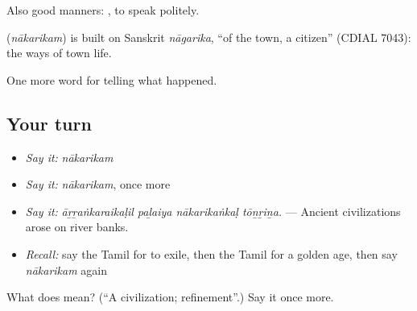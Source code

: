 Also good manners:  , to speak politely.

\begin{cousinweb}
\textbf{} (\emph{nākarikam}) is built on Sanskrit \emph{nāgarika}, \textquotedblleft{}of the town, a citizen\textquotedblright{} (CDIAL 7043): the ways of town life.
\end{cousinweb}

\begin{grammarlens}[title={What you've built}]
One more word for telling what happened.
\end{grammarlens}

\subsection*{Your turn}
\begin{itemize}
\raggedright
  \item \emph{Say it:} \emph{nākarikam}
  \item \emph{Say it:} \emph{nākarikam}, once more
  \item \emph{Say it:} \emph{āṟṟaṅkaraikaḷil paḻaiya nākarikaṅkaḷ tōṉṟiṉa.} — Ancient civilizations arose on river banks.
  \item \emph{Recall:} say the Tamil for to exile, then the Tamil for a golden age, then say \emph{nākarikam} again
\end{itemize}

\begin{tcolorbox}[breakable,colback=teal!4,colframe=teal!35!black,title={Before you move on}]
What does  mean? (\textquotedblleft{}A civilization; refinement\textquotedblright{}.) Say it once more.
\end{tcolorbox}
